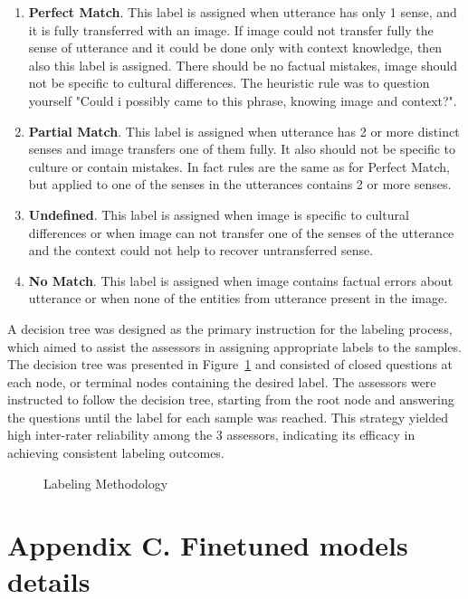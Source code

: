 \documentclass[11pt]{article}
\begin{document}
\begin{enumerate}
    \item \textbf{Perfect Match}. This label is assigned when utterance has only 1 sense, and it is fully transferred with an image. If image could not transfer fully the sense of utterance and it could be done only with context knowledge, then also this label is assigned. There should be no factual mistakes, image should not be specific to cultural differences. The heuristic rule was to question yourself "Could i possibly came to this phrase, knowing image and context?". 
    \item \textbf{Partial Match}. This label is assigned when utterance has 2 or more distinct senses and image transfers one of them fully. It also should not be specific to culture or contain mistakes. In fact rules are the same as for Perfect Match, but applied to one of the senses in the utterances contains 2 or more senses.
    \item \textbf{Undefined}. This label is assigned when image is specific to cultural differences or when image can not transfer one of the senses of the utterance and the context could not help to recover untransferred sense.
    \item \textbf{No Match}. This label is assigned when image contains factual errors about utterance or when none of the entities from utterance present in the image.
\end{enumerate}

\smallskip

A decision tree was designed as the primary instruction for the labeling process, which aimed to assist the assessors in assigning appropriate labels to the samples. The decision tree was presented in Figure~\ref{LabelingMethod} and consisted of closed questions at each node, or terminal nodes containing the desired label. The assessors were instructed to follow the decision tree, starting from the root node and answering the questions until the label for each sample was reached. This strategy yielded high inter-rater reliability among the 3 assessors, indicating its efficacy in achieving consistent labeling outcomes.

\begin{figure}[h]
\centering
\caption{Labeling Methodology}
\label{LabelingMethod}
\end{figure}

\section*{Appendix C. Finetuned models details}
\end{document}
